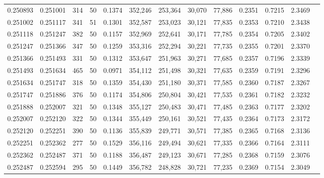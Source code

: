 \begin{tabular}{rrrrrrrrrrrrr}
0.250893 & 0.251001 &   314 &  50 &                                     0.1374 & 352,246 & 253,364 &  30,070 &  77,886 & 0.2351 & 0.7215 & 2.3469 \\
0.251002 & 0.251117 &   341 &  51 &                                     0.1301 & 352,587 & 253,023 &  30,121 &  77,835 & 0.2353 & 0.7210 & 2.3438 \\
0.251118 & 0.251247 &   382 &  50 &                                     0.1157 & 352,969 & 252,641 &  30,171 &  77,785 & 0.2354 & 0.7205 & 2.3402 \\
0.251247 & 0.251366 &   347 &  50 &                                     0.1259 & 353,316 & 252,294 &  30,221 &  77,735 & 0.2355 & 0.7201 & 2.3370 \\
0.251366 & 0.251493 &   331 &  50 &                                     0.1312 & 353,647 & 251,963 &  30,271 &  77,685 & 0.2357 & 0.7196 & 2.3339 \\
0.251493 & 0.251634 &   465 &  50 &                                     0.0971 & 354,112 & 251,498 &  30,321 &  77,635 & 0.2359 & 0.7191 & 2.3296 \\
0.251634 & 0.251747 &   318 &  50 &                                     0.1359 & 354,430 & 251,180 &  30,371 &  77,585 & 0.2360 & 0.7187 & 2.3267 \\
0.251747 & 0.251886 &   376 &  50 &                                     0.1174 & 354,806 & 250,804 &  30,421 &  77,535 & 0.2361 & 0.7182 & 2.3232 \\
0.251888 & 0.252007 &   321 &  50 &                                     0.1348 & 355,127 & 250,483 &  30,471 &  77,485 & 0.2363 & 0.7177 & 2.3202 \\
0.252007 & 0.252120 &   322 &  50 &                                     0.1344 & 355,449 & 250,161 &  30,521 &  77,435 & 0.2364 & 0.7173 & 2.3172 \\
0.252120 & 0.252251 &   390 &  50 &                                     0.1136 & 355,839 & 249,771 &  30,571 &  77,385 & 0.2365 & 0.7168 & 2.3136 \\
0.252251 & 0.252362 &   277 &  50 &                                     0.1529 & 356,116 & 249,494 &  30,621 &  77,335 & 0.2366 & 0.7164 & 2.3111 \\
0.252362 & 0.252487 &   371 &  50 &                                     0.1188 & 356,487 & 249,123 &  30,671 &  77,285 & 0.2368 & 0.7159 & 2.3076 \\
0.252487 & 0.252594 &   295 &  50 &                                     0.1449 & 356,782 & 248,828 &  30,721 &  77,235 & 0.2369 & 0.7154 & 2.3049 \\

\end{tabular}
